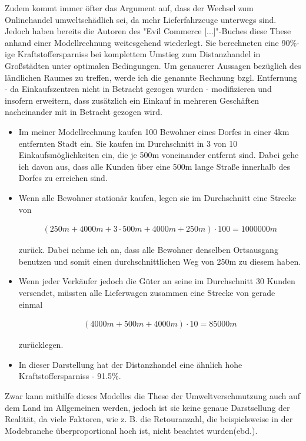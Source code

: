 \begin{folding} %

Zudem kommt immer öfter das Argument auf, dass der Wechsel zum Onlinehandel umweltschädlich sei, da mehr Lieferfahrzeuge unterwegs sind. Jedoch haben bereits die Autoren des "Evil Commerce [...]"-Buches diese These anhand einer Modellrechnung weitesgehend wiederlegt. Sie berechneten eine 90\%-ige Kraftstoffersparniss bei komplettem Umstieg zum Distanzhandel in Großstädten unter optimalen Bedingungen\cite[S. 25f]{evilcom}. Um genauerer Aussagen bezüglich des ländlichen Raumes zu treffen, werde ich die genannte Rechnung bzgl. Entfernung - da Einkaufszentren nicht in Betracht gezogen wurden - modifizieren und insofern erweitern, dass zusätzlich ein Einkauf in mehreren Geschäften nacheinander mit in Betracht gezogen wird.

\begin{itemize}

\item Im meiner Modellrechnung kaufen 100 Bewohner eines Dorfes in einer 4km entfernten Stadt ein. Sie kaufen im Durchschnitt in 3 von 10 Einkaufsmöglichkeiten ein, die je 500m voneinander entfernt sind. Dabei gehe ich davon aus, dass alle Kunden über eine 500m lange Straße innerhalb des Dorfes zu erreichen sind.

\item Wenn alle Bewohner stationär kaufen, legen sie im Durchschnitt eine Strecke von 

\begin{align}(250m + 4000m + 3 \cdot 500m + 4000m + 250m) \cdot 100 = 1000000m\end{align}

 zurück. Dabei nehme ich an, dass alle Bewohner denselben Ortsausgang benutzen und somit einen durchschnittlichen Weg von 250m zu diesem haben.

\item Wenn jeder Verkäufer jedoch die Güter an seine im Durchschnitt 30 Kunden versendet, müssten alle Lieferwagen zusammen eine Strecke von gerade einmal 

\begin{align}(4000m + 500m + 4000m) \cdot 10 = 85000m\end{align}

zurücklegen.
\item In dieser Darstellung hat der Distanzhandel eine ähnlich hohe Kraftstoffersparniss - 91.5\%. 

\end{itemize}

Zwar kann mithilfe dieses Modelles die These der Umweltverschmutzung auch auf dem Land im Allgemeinen werden, jedoch ist sie keine genaue Darstsellung der Realität, da viele Faktoren, wie z. B. die Retouranzahl, die beispielsweise in der Modebranche überproportional hoch ist, nicht beachtet wurden(ebd.).

\end{folding}
